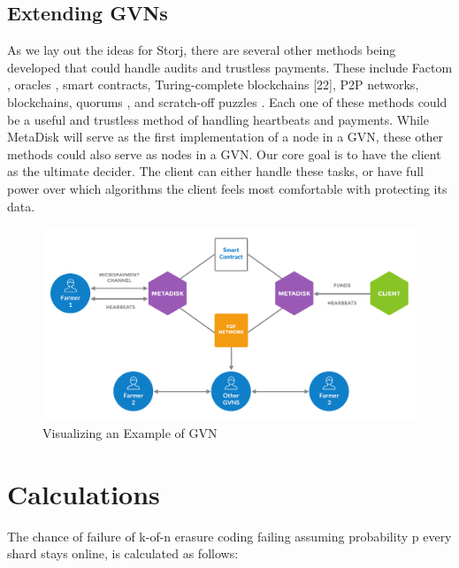 \documentclass[a4paper,10pt]{article}
\begin{document}
\subsection{Extending GVNs}
As we lay out the ideas for Storj, there are several other methods being developed that could handle audits and trustless payments. These include Factom \cite{7}, oracles \cite{21}, smart contracts, Turing-complete blockchains [22], P2P networks, blockchains, quorums \cite{20}, and scratch-off puzzles \cite{23}. Each one of these methods could be a useful and trustless method of handling heartbeats and payments. While MetaDisk \cite{1} will serve as the first implementation of a node in a GVN, these other methods could also serve as nodes in a GVN. Our core goal is to have the client as the ultimate decider. The client can either handle these tasks, or have full power over which algorithms the client feels most comfortable with protecting its data. 

\begin{figure}[hbt]
\centering
\includegraphics[width=\linewidth]{9}
\caption{Visualizing an Example of GVN}
\end{figure}

\section{Calculations}
The chance of failure of k-of-n erasure coding failing assuming probability p every shard stays online, is calculated as follows:
\end{document}
